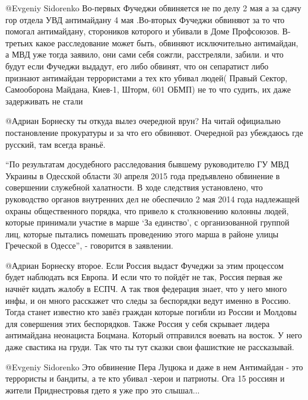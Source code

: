 \begin{multicols}{2}
\begin{itemize}
@Evgeniy Sidorenko Во-первых Фучеджи обвиняется не по делу 2 мая а за сдачу
гор отдела УВД антимайдану 4 мая .Во-вторых Фучеджи обвиняют за то что помогал
антимайдану, стороников которого и убивали в Доме Профсоюзов. В-третьих какое
расследование может быть, обвиняют исключительно антимайдан, а МВД уже тогда
заявило, они сами себя сожгли, расстреляли, забили. и что будут если Фучеджи
выдадут, его либо обвинят, что он сепаратист либо признают антимайдан
террористами а тех кто убивал людей( Правый Сектор, Самооборона Майдана,
Киев-1, Шторм, 601 ОБМП)  не то что судить, их даже задерживать не стали


@Адриан Борнеску  ты откуда вылез очередной врун? На читай официально
постановление прокуратуры и за что его обвиняют. Очередной раз убеждаюсь где
русский, там всегда враньё. 

\enquote{По результатам досудебного расследования бывшему руководителю ГУ МВД Украины в
Одесской области 30 апреля 2015 года предъявлено обвинение в совершении
служебной халатности. В ходе следствия установлено, что руководство органов
внутренних дел не обеспечило 2 мая 2014 года надлежащей охраны общественного
порядка, что привело к столкновению колонны людей, которые принимали участие в
марше \enquote{За единство}, с организованной группой лиц, которые пытались помешать
проведению этого марша в районе улицы Греческой в Одессе}, - говорится в
заявлении.


@Адриан Борнеску  второе. Если Россия выдаст Фучеджи за этим процессом будет
наблюдать вся Европа. И если что то пойдёт не так, Россия первая же начнёт
кидать жалобу в ЕСПЧ. А так твоя федерация знает, что у него много инфы, и он
много расскажет что следы за беспорядки ведут именно в Россию. Тогда станет
известно кто завёз граждан которые погибли из России и Молдовы для совершения
этих беспорядков. Также Россия у себя скрывает лидера антимайдана неонациста
Боцмана. Который отправился воевать на восток. У него даже свастика на груди.
Так что ты тут сказки свои фашисткие не рассказывай. 


@Evgeniy Sidorenko  Это обвинение Пера Луцюка и даже в нем Антимайдан - это
террористы и бандиты, а те кто убивал -херои и патриоты. Ога 15 россиян и
жители Приднестровья гдето я уже про это слышал... 


\end{itemize} %


\end{multicols}
